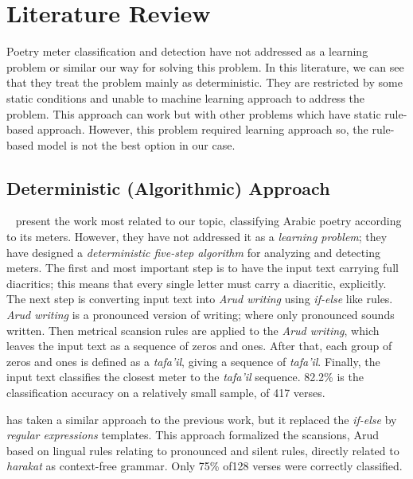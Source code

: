 \chapter{Literature Review}\label{Ch:Literature}
Poetry meter classification and detection have not addressed as a learning problem or similar our way for solving this problem. In this literature, we can see that they treat the problem mainly as deterministic. They are restricted by some static conditions and {\color{ref}unable to machine learning approach to address the problem. This approach can work but with other problems which have static rule-based approach. However, this problem required learning approach so, the rule-based model is not the best option in our case. }



\section{Deterministic (Algorithmic) Approach}\label{sec:Determ_Algor_Appr}

~\cite{Abuata2016RuleBasedAlgorithm} present the work most related to our topic, classifying Arabic poetry according to its meters. However, they have not addressed it as a \textit{learning problem}; they have designed a \textit{deterministic five-step algorithm} for analyzing and detecting meters. The first and most important step is to have the input text carrying full diacritics; this means that every single letter must carry a diacritic, explicitly. The next step is converting input text into \textit{Arud writing} using \textit{if-else} like rules. \textit{Arud writing} is a pronounced version of writing; where only pronounced sounds written. Then metrical scansion rules are applied to the \textit{Arud writing}, which leaves the input text as a sequence of zeros and ones. After that, each group of zeros and ones is defined as a \textit{tafa'il}, giving a sequence of \textit{tafa'il}. Finally, the input text classifies the closest meter to the \textit{tafa'il} sequence. 82.2\% is the classification accuracy on a relatively small sample, of 417 verses.

\cite{Alnagdawi2013FindingArabicPoemMeter} has taken a similar approach to the previous work, but it replaced the \textit{if-else} by \textit{regular expressions} templates. This approach formalized the scansions, Arud based on lingual rules relating to pronounced and silent rules, directly related to \textit{harakat} as context-free grammar. Only 75\% of128 verses were correctly classified. 

